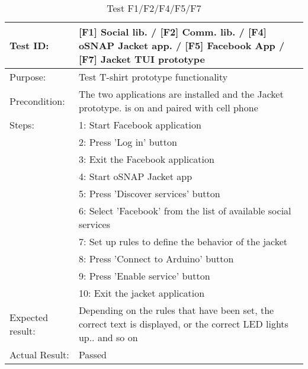 \begin{table}[h!]
\begin{tabular}{|l|p{10cm}|}
\hline Test ID: &		[F1] Social lib. / [F2] Comm. lib. / [F4] oSNAP Jacket app. /
						[F5] Facebook App / [F7] Jacket TUI prototype \\
\hline Purpose: &		Test T-shirt prototype functionality \\
\hline Precondition: &	The two applications are installed and the Jacket prototype.
						is on and paired with cell phone \\
\hline
Steps:
  & 1: Start Facebook application \\
  & 2: Press 'Log in' button \\
  & 3: Exit the Facebook application \\
  & 4: Start oSNAP Jacket app \\
  & 5: Press 'Discover services' button \\
  & 6: Select 'Facebook' from the list of available social services \\
  & 7: Set up rules to define the behavior of the jacket \\
  & 8: Press 'Connect to Arduino' button \\
  & 9: Press 'Enable service' button \\
  &10: Exit the jacket application \\
\hline
Expected result:
   & Depending on the rules that have been set, the correct text is displayed,
   or the correct LED lights up.. and so on \\
\hline
Actual Result:
  &  Passed \\
\hline
\end{tabular}
\caption{Test F1/F2/F4/F5/F7}
\label{tbl:f1f2f4f5f7test}
\end{table}

